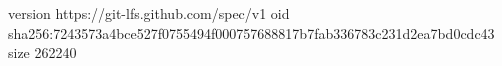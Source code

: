 version https://git-lfs.github.com/spec/v1
oid sha256:7243573a4bce527f0755494f000757688817b7fab336783c231d2ea7bd0cdc43
size 262240
